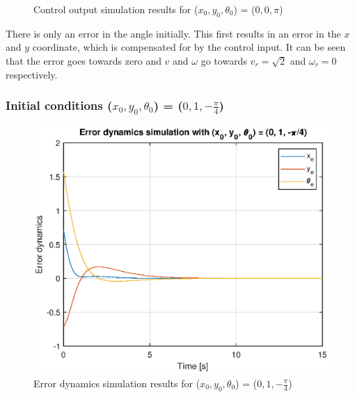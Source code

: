 \begin{figure}[H]
\begin{minipage}{0.5\textwidth}
    \caption{Control output simulation results for ($x_0, y_0, \theta_0$) = ($0, 0, \pi$)}
    \label{fig:ex6_controlb}
\end{minipage}
\end{figure}

There is only an error in the angle initially. This first results in an error in the $x$ and $y$ coordinate, which is compensated for by the control input. It can be seen that the error goes towards zero and $v$ and $\omega$ go towards $v_r = \sqrt{2}$ and $\omega_r = 0$ respectively.

\subsubsection*{Initial conditions ($x_0, y_0, \theta_0$) = ($0, 1, -\frac{\pi}{4}$)}
\begin{figure}[H]
\begin{minipage}{0.5\textwidth}
    \centering
    \includegraphics[width=\textwidth]{Problems/ex6_errorc.eps}
    \caption{Error dynamics simulation results for ($x_0, y_0, \theta_0$) = ($0, 1, -\frac{\pi}{4}$)}
    \label{fig:ex6_errorc}
\end{minipage}
\begin{minipage}{0.5\textwidth}
    \centering

\end{minipage}
\end{figure}
